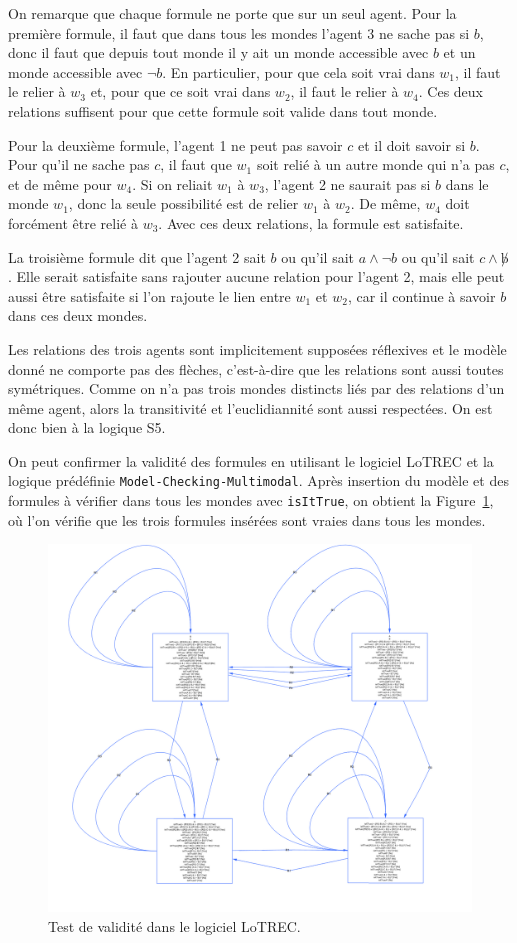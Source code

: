 \documentclass[a4paper,11pt]{amsart}
\theoremstyle{plain}
\begin{document}
On remarque que chaque formule ne porte que sur un seul agent. Pour la première formule, il faut que dans tous les mondes l'agent 3 ne sache pas si $b$, donc il faut que depuis tout monde il y ait un monde accessible avec $b$ et un monde accessible avec $\lnot b$. En particulier, pour que cela soit vrai dans $w_1$, il faut le relier à $w_3$ et, pour que ce soit vrai dans $w_2$, il faut le relier à $w_4$. Ces deux relations suffisent pour que cette formule soit valide dans tout monde.

Pour la deuxième formule, l'agent 1 ne peut pas savoir $c$ et il doit savoir si $b$. Pour qu'il ne sache pas $c$, il faut que $w_1$ soit relié à un autre monde qui n'a pas $c$, et de même pour $w_4$. Si on reliait $w_1$ à $w_3$, l'agent 2 ne saurait pas si $b$ dans le monde $w_1$, donc la seule possibilité est de relier $w_1$ à $w_2$. De même, $w_4$ doit forcément être relié à $w_3$. Avec ces deux relations, la formule est satisfaite.

La troisième formule dit que l'agent 2 sait $b$ ou qu'il sait $a \land \lnot b$ ou qu'il sait $c \land \not b$. Elle serait satisfaite sans rajouter aucune relation pour l'agent 2, mais elle peut aussi être satisfaite si l'on rajoute le lien entre $w_1$ et $w_2$, car il continue à savoir $b$ dans ces deux mondes.

Les relations des trois agents sont implicitement supposées réflexives et le modèle donné ne comporte pas des flèches, c'est-à-dire que les relations sont aussi toutes symétriques. Comme on n'a pas trois mondes distincts liés par des relations d'un même agent, alors la transitivité et l'euclidiannité sont aussi respectées. On est donc bien à la logique S5.

On peut confirmer la validité des formules en utilisant le logiciel LoTREC et la logique prédéfinie \texttt{Model-Checking-Multimodal}. Après insertion du modèle et des formules à vérifier dans tous les mondes avec \texttt{isItTrue}, on obtient la Figure~\ref{FigLoTREC}, où l'on vérifie que les trois formules insérées sont vraies dans tous les mondes.

\begin{figure}[ht]
\centering
\includegraphics[width=\textwidth]{../premodel_exo4.png}
\caption{Test de validité dans le logiciel LoTREC.}
\label{FigLoTREC}
\end{figure}
\end{document}
